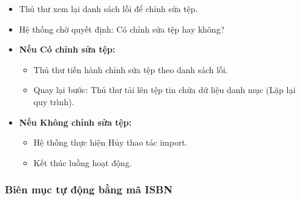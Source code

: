 \begin{enumerate}
\begin{itemize}
        \item Thủ thư xem lại danh sách lỗi để chỉnh sửa tệp.
        
        \item Hệ thống chờ quyết định: Có chỉnh sửa tệp hay không?
        
        \item \textbf{Nếu Có chỉnh sửa tệp:}
        \begin{itemize}
            \item Thủ thư tiến hành chỉnh sửa tệp theo danh sách lỗi.
            
            \item Quay lại bước: Thủ thư tải lên tệp tin chứa dữ liệu danh mục (Lặp lại quy trình).
        \end{itemize}
        
        \item \textbf{Nếu Không chỉnh sửa tệp:}
        \begin{itemize}
            \item Hệ thống thực hiện Hủy thao tác import.
            
            \item Kết thúc luồng hoạt động.
        \end{itemize}
    \end{itemize}
\end{enumerate}

\subsubsection{Biên mục tự động bằng mã ISBN}

